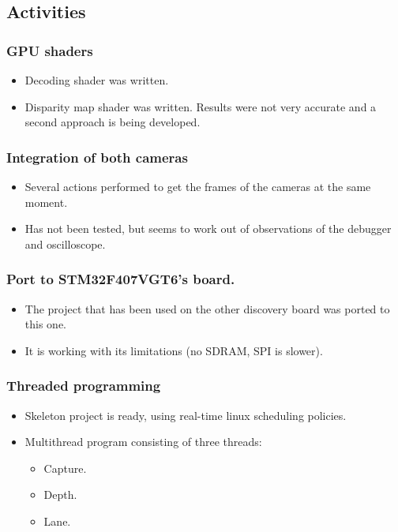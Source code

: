 \subsection{Activities}


\subsubsection{GPU shaders}
\begin{itemize}
	\item Decoding shader was written.
	\item Disparity map shader was written. Results were not very accurate and a second approach is being developed.
\end{itemize}


\subsubsection{Integration of both cameras}
\begin{itemize}
	\item Several actions performed to get the frames of the cameras at the same moment.
	\item Has not been tested, but seems to work out of observations of the debugger and oscilloscope.
\end{itemize}


\subsubsection{Port to STM32F407VGT6's board.}
\begin{itemize}
	\item The project that has been used on the other discovery board was ported to this one.
	\item It is working with its limitations (no SDRAM, SPI is slower).
\end{itemize}


\subsubsection{Threaded programming}
\begin{itemize}
	\item Skeleton project is ready, using real-time linux scheduling policies.
	\item Multithread program consisting of three threads:
	\begin{itemize}
		\item Capture.
		\item Depth.
		\item Lane.
	\end{itemize}
\end{itemize}
